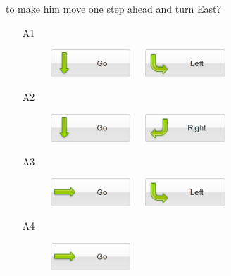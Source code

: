 \documentclass[article,A4,12pt]{llncs}
\begin{document}
\begin{enumerate}
to make him move one step ahead and turn East?
\begin{enumerate}
\item[A1] 
\begin{figure}[!ht]
\begin{center}
\includegraphics[width=3cm]{imgk/button-go-4.png}\ \ \
\includegraphics[width=3cm]{imgk/button-left-4.png}
\end{center}
\end{figure}
\newpage
\item[A2] 
\begin{figure}[!ht]
\begin{center}
\includegraphics[width=3cm]{imgk/button-go-4.png}\ \ \
\includegraphics[width=3cm]{imgk/button-right-4.png}
\end{center}
\end{figure}
\item[A3] 
\begin{figure}[!ht]
\begin{center}
\includegraphics[width=3cm]{imgk/button-go-1.png}\ \ \
\includegraphics[width=3cm]{imgk/button-left-4.png}
\end{center}
\end{figure}
\item[A4] 
\begin{figure}[!ht]
\begin{center}
\includegraphics[width=3cm]{imgk/button-go-1.png}\ \ \

\end{center}
\end{figure}
\end{enumerate}
\end{enumerate}
\end{document}
